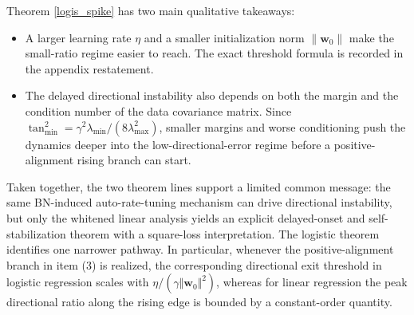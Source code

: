 \documentclass[pdflatex,sn-basic]{sn-jnl}%
\theoremstyle{thmstyleone}%
\begin{document}
Theorem \ref{logis_spike} has two main qualitative takeaways:
\begin{itemize}
    \item A larger learning rate $\eta$ and a smaller initialization norm $\|\mathbf w_0\|$ make the small-ratio regime easier to reach. The exact threshold formula is recorded in the appendix restatement.
    \item The delayed directional instability also depends on both the margin and the condition number of the data covariance matrix. Since $\tan_{\min}^2 = {\gamma^2 \lambda_{\min}}/{(8 \lambda_{\max}^2)}$, smaller margins and worse conditioning push the dynamics deeper into the low-directional-error regime before a positive-alignment rising branch can start.
\end{itemize}
Taken together, the two theorem lines support a limited common message: the same BN-induced auto-rate-tuning mechanism can drive directional instability, but only the whitened linear analysis yields an explicit delayed-onset and self-stabilization theorem with a square-loss interpretation. The logistic theorem identifies one narrower pathway. In particular, whenever the positive-alignment branch in item (3) is realized, the corresponding directional exit threshold in logistic regression scales with $\eta / (\gamma \Vert \mathbf{w}_0 \Vert^2)$, whereas for linear regression the peak directional ratio along the rising edge is bounded by a constant-order quantity.
\end{document}
